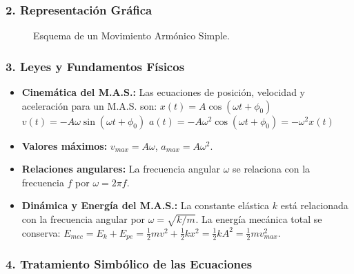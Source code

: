 \subsubsection*{2. Representación Gráfica}
\begin{figure}[H]
    \centering
    \caption{Esquema de un Movimiento Armónico Simple.}
\end{figure}

\subsubsection*{3. Leyes y Fundamentos Físicos}
\begin{itemize}
    \item \textbf{Cinemática del M.A.S.:} Las ecuaciones de posición, velocidad y aceleración para un M.A.S. son:
        $x(t) = A \cos(\omega t + \phi_0)$
        $v(t) = -A\omega \sin(\omega t + \phi_0)$
        $a(t) = -A\omega^2 \cos(\omega t + \phi_0) = -\omega^2 x(t)$
    \item \textbf{Valores máximos:} $v_{max} = A\omega$, $a_{max} = A\omega^2$.
    \item \textbf{Relaciones angulares:} La frecuencia angular $\omega$ se relaciona con la frecuencia $f$ por $\omega=2\pi f$.
    \item \textbf{Dinámica y Energía del M.A.S.:} La constante elástica $k$ está relacionada con la frecuencia angular por $\omega = \sqrt{k/m}$. La energía mecánica total se conserva:
        $E_{mec} = E_k + E_{pe} = \frac{1}{2}mv^2 + \frac{1}{2}kx^2 = \frac{1}{2}kA^2 = \frac{1}{2}mv_{max}^2$.
\end{itemize}

\subsubsection*{4. Tratamiento Simbólico de las Ecuaciones}
